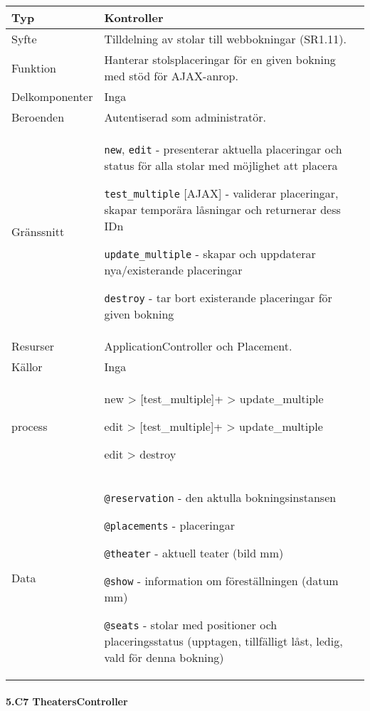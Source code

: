 \documentclass[a4paper, twoside, 11pt, titlepage]{article}
\begin{document}
			\begin {table} [ht] \begin{tabular} {  p{3.5cm} p{9.6cm} }
				\hline
				{Typ} & {Kontroller} \\
				\hline
				{Syfte} & {Tilldelning av stolar till webbokningar (SR1.11).} \\
				\hline
				{Funktion} & {Hanterar stolsplaceringar för en given bokning med stöd för AJAX-anrop.} \\
				\hline
				{Delkomponenter} & {Inga} \\
				\hline
				{Beroenden} & {Autentiserad som administratör.} \\
				\hline
				{Gränssnitt} & {{\tt new}, {\tt edit} - presenterar aktuella placeringar och status för alla stolar med möjlighet att placera

{\tt test\_multiple} [AJAX] - validerar placeringar, skapar temporära låsningar och returnerar dess IDn

{\tt update\_multiple} - skapar och uppdaterar nya/existerande placeringar

{\tt destroy} - tar bort existerande placeringar för given bokning} \\
				\hline
				{Resurser} & {ApplicationController och Placement.} \\
				\hline
				{Källor} & {Inga} \\
				\hline
				{process} & {new > [test\_multiple]+ > update\_multiple

edit > [test\_multiple]+ > update\_multiple

edit > destroy} \\
				\hline
				{Data} & {{\tt @reservation} - den aktulla bokningsinstansen

{\tt @placements} - placeringar

{\tt @theater} - aktuell teater (bild mm)

{\tt @show} - information om föreställningen (datum mm)

{\tt @seats} - stolar med positioner och placeringsstatus (upptagen, tillfälligt låst, ledig, vald för denna bokning)} \\
				\hline
			\end{tabular} \end{table} \FloatBarrier


			\paragraph{5.C7 TheatersController}\
\end{document}
